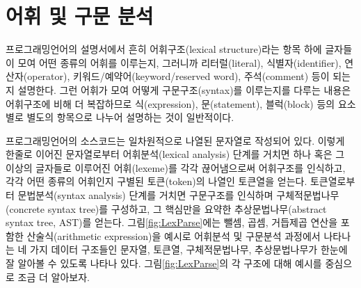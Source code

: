\section{어휘 및 구문 분석}
\label{sec:LexParse}
프로그래밍언어의 설명서\cite{Swift5Ref,CSharp6Draft,JavaSE8spec,Haskell2010}에서
흔히
%
%
어휘구조(lexical structure)라는 항목 하에 글자들이 모여 어떤 종류의
어휘를 이루는지, 그러니까 리터럴(literal), 식별자(identifier), 연산자(operator),
키워드/예약어(keyword/reserved word), 주석(comment) 등이 되는지 설명한다.
%
%
그런 어휘가 모여 어떻게 구문구조(syntax)를 이루는지를 다루는 내용은
어휘구조에 비해 더 복잡하므로 식(expression), 문(statement), 블럭(block) 등의
요소별로 별도의 항목으로 나누어 설명하는 것이 일반적이다.

프로그래밍언어의 소스코드는 일차원적으로 나열된 문자열로 작성되어 있다.
이렇게 한줄로 이어진 문자열로부터
%
%
어휘분석(lexical analysis) 단계를 거치면
하나 혹은 그 이상의 글자들로 이루어진 어휘(lexeme)를 각각 끊어냄으로써
어휘구조를 인식하고, 각각 어떤 종류의 어휘인지 구별된
%
%
토큰(token)의
나열인 토큰열을 얻는다. 토큰열로부터
%
%
문법분석(syntax analysis) 단계를
거치면 구문구조를 인식하며
구체적문법나무(concrete syntax tree)를 구성하고,
그 핵심만을 요약한
%
%
%
%
%
%
추상문법나무(abstract syntax tree, AST)를 얻는다.
그림\;\ref{fig:LexParse}에는 뺄셈, 곱셈, 거듭제곱 연산을 포함한
산술식(arithmetic expression)을 예시로 어휘분석 및 구문분석 과정에서
나타나는 네 가지 데이터 구조들인 문자열, 토큰열, 구체적문법나무,
추상문법나무가 한눈에 잘 알아볼 수 있도록 나타나 있다.
그림\;\ref{fig:LexParse}의 각 구조에 대해 예시를 중심으로 조금
더 알아보자.


